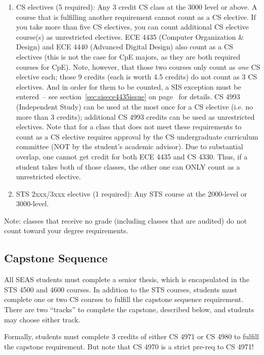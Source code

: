 \documentclass[10pt,letter]{book}
\begin{document}
\begin{enumerate}
\item CS electives (5 required): Any 3 credit CS class at the 3000
  level or above. A course that is fulfilling another requirement
  cannot count as a CS elective. If you take more than five CS
  electives, you can count additional CS elective course(s) as
  unrestricted electives. ECE 4435 (Computer Organization \&
  Design) and ECE 4440 (Advanced Digital Design) also count as a
  CS electives (this is not the case for CpE majors, as they are both
  required courses for CpE). Note, however, that those two courses
  only count as {\em one} CS elective each; those 9 credits (each is
  worth 4.5 credits) do not count as 3 CS electives.  And in order for
  them to be counted, a SIS exception must be entered~-- see
  section~\ref{sec:sisece4435issue} on
  page~\pageref{sec:sisece4435issue} for details.  CS 4993
  (Independent Study) can be used at the most once for a CS elective
  (i.e. no more than 3 credits); additional CS 4993 credits can
  be used as unrestricted electives. Note that for a class that does
  not meet these requirements to count as a CS elective requires
  approval by the CS undergraduate curriculum committee (NOT by the
  student's academic advisor). Due to substantial overlap, one cannot
  get credit for both ECE 4435 and CS 4330. Thus, if a
  student takes both of those classes, the other one can ONLY count as
  a unrestricted elective.

\item STS 2xxx/3xxx elective (1 required): Any STS course at the
  2000-level or 3000-level.
\end{enumerate}
 
Note: classes that receive no grade (including classes that are
audited) do not count toward your degree requirements.

\subsection{Capstone Sequence}
\label{capstone-section}

All SEAS students must complete a senior thesis, which is encapsulated
in the STS 4500 and 4600 courses.  In addition to the STS courses,
students must complete one or two CS courses to fulfill the capstone
sequence requirement.  There are two ``tracks'' to complete the
capstone, described below, and students may choose either track.

Formally, students must complete 3 credits of either CS 4971 or CS
4980 to fulfill the capstone requirement.  But note that CS 4970 is a
strict pre-req to CS 4971!
\end{document}

